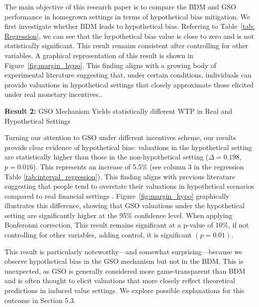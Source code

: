 \documentclass[12pt]{article}
\begin{document}
 The main objective of this research paper is to compare the BDM and GSO performance in homegrown settings in terms of hypothetical bias mitigation. We first investigate whether BDM leads to hypothetical bias. Referring to Table~\ref{tab: Regression}, we can see that the hypothetical bias value is close to zero and is not statistically significant. This result remains consistent after controlling for other variables. A graphical representation of this result is shown in Figure~\ref{fig:margin_hypo}. This finding aligns with a growing body of experimental literature suggesting that, under certain conditions, individuals can provide valuations in hypothetical settings that closely approximate those elicited under real monetary incentives.\citep{branas-garza_paid_2023, drichoutis_incentives_2025}. 
 
 
\vspace{0.5cm}

\textbf{Result 2:} GSO Mechanism Yields statistically different WTP in Real and Hypothetical Settings 

Turning our attention to GSO under different incentives scheme, our results provide clear evidence of hypothetical bias: valuations in the hypothetical setting are statistically higher than those in the non-hypothetical setting (\(\Delta = 0.198\), \(p =0.016\)). This represents  an increase of  5.5\% (see column 3 in the regression Table \ref{tab:interval_regression}). This finding aligns with previous literature suggesting that people tend to overstate their valuations in hypothetical scenarios compared to real financial settings \citep{penn2018understanding, fang_use_2021}. Figure~\ref{fig:margin_hypo} graphically illustrates this difference, showing that GSO valuations under the hypothetical setting are significantly higher at the 95\% confidence level. When applying Bonferonni correction, This result remains significant at a p-value of 10\%, if not controlling for other variables, adding control, it is significant \((p = 0.01)\).


This result is particularly noteworthy—and somewhat surprising—because we observe hypothetical bias in the GSO mechanism but not in the BDM. This is unexpected, as GSO is generally considered more game-transparent than BDM and is often thought to elicit valuations that more closely reflect theoretical predictions in induced value settings. We explore possible explanations for this outcome in Section 5.3.
\end{document}
